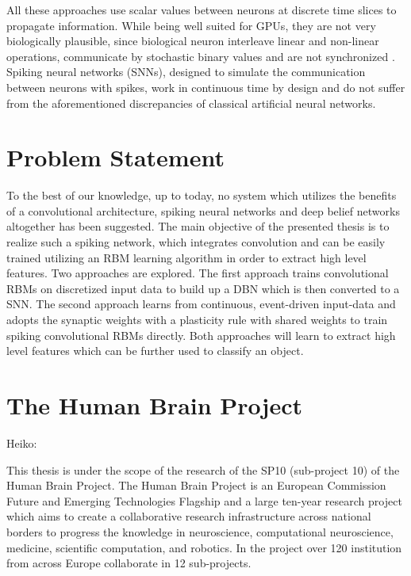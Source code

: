 All these approaches use scalar values between neurons at discrete time slices to propagate information. 
While being well suited for GPUs, they are not very biologically plausible, since biological neuron interleave linear and non-linear operations, communicate by stochastic binary values and are not synchronized \cite{bengio2015towards}. 
Spiking neural networks (SNNs), designed to simulate the communication between neurons with spikes, work in continuous time by design and do not suffer from the aforementioned discrepancies of classical artificial neural networks.

\section{Problem Statement} \label{c:probstate}

To the best of our knowledge, up to today, no system which utilizes the benefits of a convolutional architecture, spiking neural networks and deep belief networks altogether has been suggested. 
The main objective of the presented thesis is to realize such a spiking network, which integrates convolution and can be easily trained utilizing an RBM learning algorithm in order to extract high level features. 
Two approaches are explored. 
The first approach trains convolutional RBMs on discretized input data to build up a DBN which is then converted to a SNN. 
The second approach learns from continuous, event-driven input-data and adopts the synaptic weights with a plasticity rule with shared weights to train spiking convolutional RBMs directly. 
Both approaches will learn to extract high level features which can be further used to classify an object. 

\section{The Human Brain Project} \label{c:thehbp}

Heiko:

This thesis is under the scope of the research of the SP10 (sub-project 10) of the Human Brain
Project. The Human Brain Project is an European Commission Future and Emerging Technologies Flagship and a large ten-year research project which aims to create a collaborative research infrastructure across national borders to progress the knowledge in neuroscience, computational neuroscience, medicine, scientific computation, and robotics. In the project over 120
institution from across Europe collaborate in 12 sub-projects.

